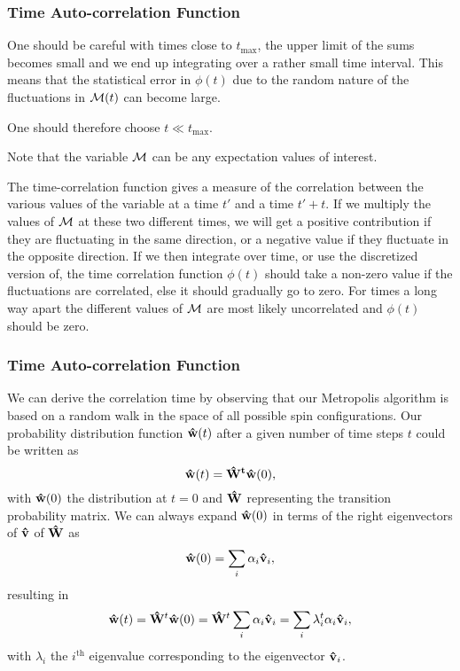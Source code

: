 \frame
{
  \frametitle{Time Auto-correlation Function}
\begin{small}
{\scriptsize
One should be careful with times close to $t_{\mathrm{max}}$, the upper limit of the sums 
becomes small and we end up integrating over a rather small time interval. This means that the statistical
error in $\phi(t)$ due to the random nature of the fluctuations in ${\cal M}(t)$ can become large.

One should therefore choose $t \ll t_{\mathrm{max}}$.

Note that the variable ${\cal M}$ can be any expectation values of interest.



The time-correlation function gives a measure of the correlation between the various values of the variable 
at a time $t'$ and a time $t'+t$. If we multiply the values of ${\cal M}$ at these two different times,
we will get a positive contribution if they are fluctuating in the same direction, or a negative value
if they fluctuate in the opposite direction. If we then integrate over time, or use the discretized version of, the time correlation function $\phi(t)$ should take a non-zero value if the fluctuations are 
correlated, else it should gradually go to zero. For times a long way apart 
the different values of ${\cal M}$  are most likely 
uncorrelated and $\phi(t)$ should be zero.
}
\end{small}
}




\frame
{
  \frametitle{Time Auto-correlation Function}
\begin{small}
{\scriptsize
We can derive the correlation time by observing that our Metropolis algorithm is based on a random
walk in the space of all  possible spin configurations. 
Our probability 
distribution function ${\bf \hat{w}}(t)$ after a given number of time steps $t$ could be written as
\[
   {\bf \hat{w}}(t) = {\bf \hat{W}^t\hat{w}}(0),
\]
with ${\bf \hat{w}}(0)$ the distribution at $t=0$ and ${\bf \hat{W}}$ representing the 
transition probability matrix. 
We can always expand ${\bf \hat{w}}(0)$ in terms of the right eigenvectors of 
${\bf \hat{v}}$ of ${\bf \hat{W}}$ as 
\[
    {\bf \hat{w}}(0)  = \sum_i\alpha_i{\bf \hat{v}}_i,
\]
resulting in 
\[
   {\bf \hat{w}}(t) = {\bf \hat{W}}^t{\bf \hat{w}}(0)={\bf \hat{W}}^t\sum_i\alpha_i{\bf \hat{v}}_i=
\sum_i\lambda_i^t\alpha_i{\bf \hat{v}}_i,
\]
with $\lambda_i$ the $i^{\mathrm{th}}$ eigenvalue corresponding to  
the eigenvector ${\bf \hat{v}}_i$. 
}
\end{small}
}



